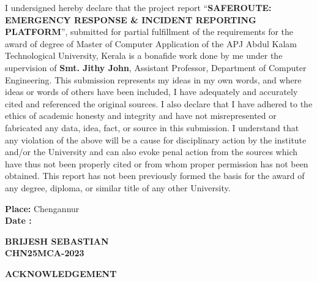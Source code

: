 \documentclass[a4paper,12pt]{report}
\newcommand{\studentname}{BRIJESH SEBASTIAN}
\newcommand{\rollno}{CHN25MCA-2023}
\newcommand{\guidename}{Smt. Jithy John}
\begin{document}
	\noindent I undersigned hereby declare that the project report ``\textbf{SAFEROUTE: EMERGENCY RESPONSE \& INCIDENT REPORTING PLATFORM}'', submitted for partial fulfillment of the requirements for the award of degree of Master of Computer Application of the APJ Abdul Kalam Technological University, Kerala is a bonafide work done by me under the supervision of \textbf{\guidename}, Assistant Professor, Department of Computer Engineering. This submission represents my ideas in my own words, and where ideas or words of others have been included, I have adequately and accurately cited and referenced the original sources. I also declare that I have adhered to the ethics of academic honesty and integrity and have not misrepresented or fabricated any data, idea, fact, or source in this submission. I understand that any violation of the above will be a cause for disciplinary action by the institute and/or the University and can also evoke penal action from the sources which have thus not been properly cited or from whom proper permission has not been obtained. This report has not been previously formed the basis for the award of any degree, diploma, or similar title of any other University.
	
	\vspace{4cm}
	
	\noindent\begin{minipage}{0.45\linewidth}
		\begin{flushleft}
			\textbf{Place:} Chengannur \\
			\textbf{Date :}
		\end{flushleft}
	\end{minipage}
	\hfill
	\begin{minipage}{0.45\linewidth}
		\begin{flushright}
			\textbf{\studentname}\\
			\textbf{\rollno}\\
		\end{flushright}
	\end{minipage}
	\clearpage
	
	\begin{center}
		\Large {\bf \uppercase{Acknowledgement}}
	\end{center}
	\vspace{1.5cm}
	
\end{document}
